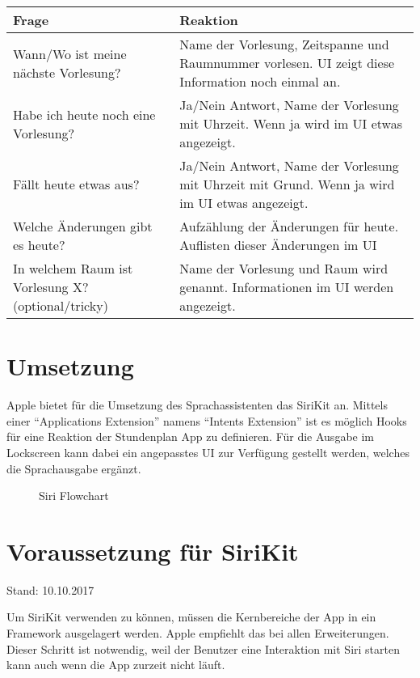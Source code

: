 \noindent%
\begin{tabularx}{\textwidth}{|p{}|X| }
\hline
\textbf{Frage} & \textbf{Reaktion}  \\ \hline 

Wann/Wo ist meine nächste Vorlesung? & Name der Vorlesung, Zeitspanne und Raumnummer vorlesen.
UI zeigt diese Information noch einmal an.\\ \hline

Habe ich heute noch eine Vorlesung? & Ja/Nein Antwort, Name der Vorlesung mit Uhrzeit. 
Wenn ja wird im UI etwas angezeigt.
\\ \hline

Fällt heute etwas aus? & Ja/Nein Antwort, Name der Vorlesung mit Uhrzeit mit Grund. 
Wenn ja wird im UI etwas angezeigt.\\ \hline
Welche Änderungen gibt es heute? & Aufzählung der Änderungen für heute.
Auflisten dieser Änderungen im UI\\ \hline
In welchem Raum ist Vorlesung X? (optional/tricky) & Name der Vorlesung und Raum wird genannt.
Informationen im UI werden angezeigt.
\\ \hline

\end{tabularx}

\section{Umsetzung}
Apple bietet für die Umsetzung des Sprachassistenten das SiriKit an. Mittels einer “Applications Extension” namens “Intents Extension” ist es möglich Hooks für eine Reaktion der Stundenplan App zu definieren. Für die Ausgabe im Lockscreen kann dabei ein angepasstes UI zur Verfügung gestellt werden, welches die Sprachausgabe ergänzt.
\newline


\begin{figure}[ht]
	\centering
	\caption{Siri Flowchart}
	\label{fig1}
\end{figure}


\section{Voraussetzung für SiriKit}

Stand: 10.10.2017

Um SiriKit verwenden zu können, müssen die Kernbereiche der App in ein Framework ausgelagert werden. 
Apple empfiehlt das bei allen Erweiterungen.  Dieser Schritt ist notwendig, weil der Benutzer eine Interaktion mit Siri starten kann auch wenn die App zurzeit nicht läuft.  



